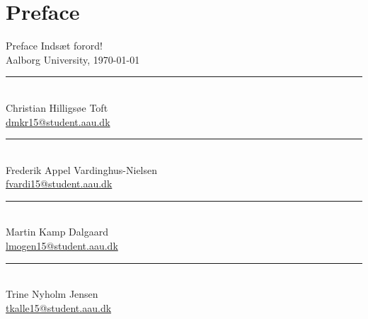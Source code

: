 \clearpage
\chapter*{Preface}
{Preface}
Indsæt forord!
\\
\vspace{\baselineskip}\hfill Aalborg University, \today
\vfill\noindent
\begin{minipage}[b]{0.45\textwidth}
 \centering
 \rule{\textwidth}{0.5pt}\\
Christian Hilligsøe Toft\\
 {\footnotesize \href{mailto:cht15@student.aau.dk}{dmkr15@student.aau.dk}}  
\end{minipage}
\hfill
\begin{minipage}[b]{0.45\textwidth}
 \centering
 \rule{\textwidth}{0.5pt}\\
Frederik Appel Vardinghus-Nielsen\\
 {\footnotesize \href{mailto:fvardi15@student.aau.dk}{fvardi15@student.aau.dk}}
\end{minipage}
\vspace{3\baselineskip}
\vspace{1\baselineskip}
\begin{minipage}[b]{0.45\textwidth}
 \centering
 \rule{\textwidth}{0.5pt}\\
Martin Kamp Dalgaard\\
 {\footnotesize \href{mailto:mkda15@student.aau.dk}{lmogen15@student.aau.dk}}  
\end{minipage}
\hfill
\begin{minipage}[b]{0.45\textwidth}
 \centering
 \rule{\textwidth}{0.5pt}\\
 Trine Nyholm Jensen\\
 {\footnotesize \href{mailto:trijen15@student.aau.dk}{tkalle15@student.aau.dk}}  
\end{minipage}
\vspace{2\baselineskip}
\vspace{1\baselineskip}
